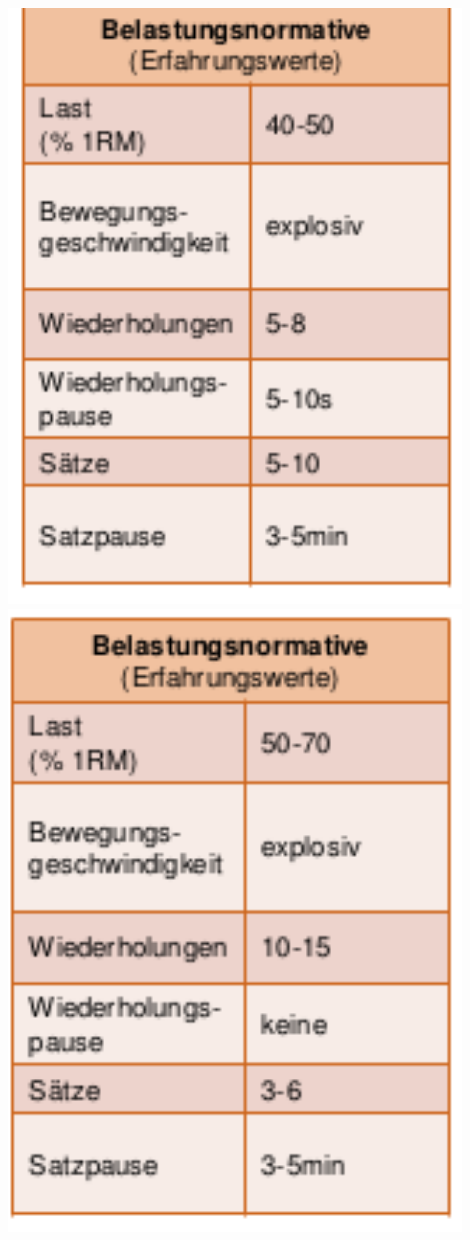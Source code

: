 \begin{minipage}{0.3\textwidth}
    \includegraphics[width=0.9\textwidth]{pictures/schnellkraftmethode}
    \includegraphics[width=0.9\textwidth]{pictures/schnellkraftorientierte_hypertrophiemethode}
\end{minipage}
